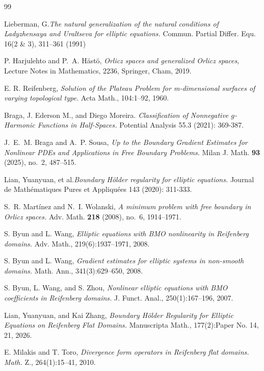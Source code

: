 \documentclass[11pt, leqno]{article}
\theoremstyle{definition}
\theoremstyle{remark}
\numberwithin{equation}{section}
\begin{document}
	
\begin{thebibliography}{99}



 Lieberman, G.{\it The natural generalization of the natural conditions of Ladyzhensaya and Uraltseva for elliptic equations.} Commun. Partial Differ. Equ. 16(2 \& 3), 311–361
(1991)


 P. Harjulehto and P.~A. H\"ast\"o, {\it Orlicz spaces and generalized Orlicz spaces}, Lecture Notes in Mathematics, 2236, Springer, Cham, 2019.


 E. R. Reifenberg, {\it Solution of the Plateau Problem for m-dimensional surfaces of varying topological type.}
Acta Math., 104:1–92, 1960.

 Braga, J. Ederson M., and Diego Moreira. {\it Classification of Nonnegative $g$-Harmonic Functions in Half-Spaces.} Potential Analysis 55.3 (2021): 369-387.

 J.~E.~M. Braga and A.~P. Sousa, {\it Up to the Boundary Gradient Estimates for Nonlinear PDEs and Applications in Free Boundary Problems.} Milan J. Math. {\bf 93} (2025), no.~2, 487--515.

 Lian, Yuanyuan, et al.{\it Boundary Hölder regularity for elliptic equations.} Journal de Mathématiques Pures et Appliquées 143 (2020): 311-333.

 S.~R. Mart\'inez and N.~I. Wolanski, {\it A minimum problem with free boundary in Orlicz spaces.} Adv. Math. {\bf 218} (2008), no.~6, 1914--1971.

 S. Byun and L. Wang, {\it Elliptic equations with BMO nonlinearity in Reifenberg domains.} Adv. Math., 219(6):1937–1971, 2008.

 S. Byun and L. Wang, {\it Gradient estimates for elliptic systems in non-smooth domains.} Math. Ann., 341(3):629–650, 2008.

 S. Byun, L. Wang, and S. Zhou, {\it Nonlinear elliptic equations with BMO coefficients in Reifenberg domains.} J. Funct. Anal., 250(1):167–196, 2007.

 Lian, Yuanyuan, and Kai Zhang, {\it Boundary H\" older Regularity for Elliptic Equations on Reifenberg Flat Domains.} Manuscripta Math., 177(2):Paper No. 14, 21, 2026.


 E. Milakis and T. Toro, {\it Divergence form operators in Reifenberg flat domains. Math.} Z., 264(1):15–41,
2010.


\end{thebibliography}
\end{document}
